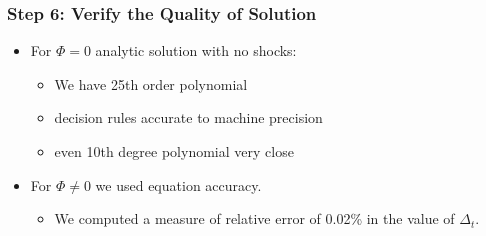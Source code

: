 \documentclass[tikz]{beamer}
\begin{document}
\begin{frame}



\end{frame}
\begin{frame}

\frametitle{Step 6: Verify the Quality of Solution}

\begin{itemize}
\item For $\Phi =0$ analytic solution with no shocks:
  \begin{itemize}
  \item We have 25th order polynomial
  \item decision rules accurate to machine precision
  \item even 10th degree polynomial very close
  \end{itemize}
\item For $\Phi \ne 0$ we used equation %
  accuracy.
  \begin{itemize}
  \item We computed a measure of relative error of 0.02\% in the value
    of $\Delta_{t}$.
  \end{itemize}
\end{itemize}












\end{frame}

\end{document}
